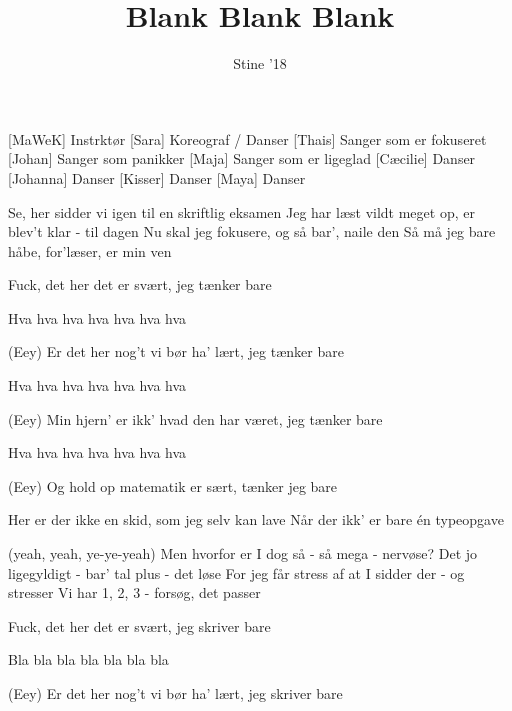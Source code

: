 \documentclass[a4paper,11pt]{article}
\title{Blank Blank Blank}
\author{Stine '18}
\begin{document}
\maketitle

\begin{roles}
[MaWeK] Instrktør
[Sara] Koreograf / Danser
[Thais] Sanger som er fokuseret
[Johan] Sanger som panikker
[Maja] Sanger som er ligeglad
[Cæcilie] Danser
[Johanna] Danser
[Kisser] Danser
[Maya] Danser
\end{roles}

\begin{song}

%  
Se, her sidder vi igen til en skriftlig eksamen 
Jeg har læst vildt meget op, er blev't klar - til dagen
Nu skal jeg fokusere, og så bar', naile den
Så må jeg bare håbe, for'læser, er min ven


%  
Fuck, det her det er svært, jeg tænker bare

%  
Hva hva hva hva hva hva hva

%  
(Eey) Er det her nog't vi bør ha' lært, jeg tænker bare

%  
Hva hva hva hva hva hva hva

%  
(Eey) Min hjern' er ikk' hvad den har været, jeg tænker bare

%  
Hva hva hva hva hva hva hva

%  
(Eey) Og hold op matematik er sært, tænker jeg bare

%  
Her er der ikke en skid, som jeg selv kan lave    
Når der ikk' er bare én typeopgave

%  
(yeah, yeah, ye-ye-yeah) 
Men hvorfor er I dog så - så mega - nervøse? 
Det jo ligegyldigt - bar' tal plus - det løse
For jeg får stress af at I sidder der - og stresser
Vi har 1, 2, 3 - forsøg, det passer


%  
Fuck, det her det er svært, jeg skriver bare

%  
Bla bla bla bla bla bla bla

%  
(Eey) Er det her nog't vi bør ha' lært, jeg skriver bare


\end{song}
\end{document}
